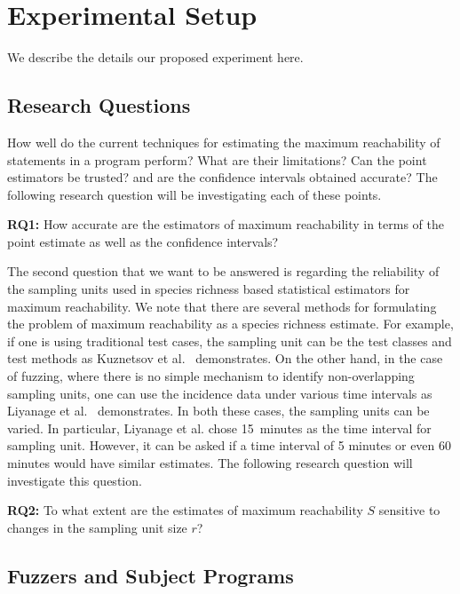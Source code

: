 \documentclass[conference]{IEEEtran}
\begin{document}


\section{Experimental Setup}
\label{sec:setup}
We describe the details our proposed experiment here.
\subsection{Research Questions}
How well do the current techniques for estimating the maximum reachability
of statements in a program perform? What are their limitations? Can the
point estimators be trusted? and are the confidence intervals obtained accurate?
The following research question will be investigating each of these points.

\noindent\textbf{RQ1:} How accurate are the estimators of maximum reachability
in terms of the point estimate as well as the confidence intervals?

The second question that we want to be answered is regarding the reliability
of the sampling units used in species richness based statistical estimators for
maximum reachability. We note that there are several methods for formulating
the problem of maximum reachability as a species richness estimate. For example,
if one is using traditional test cases, the sampling unit can be the test
classes and test methods as Kuznetsov et al.~\cite{Kuznetsov2024empirical}
demonstrates. On the other hand, in the case of fuzzing, where there is no
simple mechanism to identify non-overlapping sampling units, one can use the
incidence data under various time intervals as
Liyanage et al.~\cite{liyanage2021security} demonstrates. In both these cases, the
sampling units can be varied. In particular, Liyanage et al. chose 15~minutes
as the time interval for sampling unit. However, it can be asked if a time
interval of 5 minutes or even 60 minutes would have similar estimates.
The following research question will investigate this question.

\noindent\textbf{RQ2:} To what extent are the estimates of maximum reachability
$S$ sensitive to changes in the sampling unit size $r$?

\subsection{Fuzzers and Subject Programs}
\end{document}
